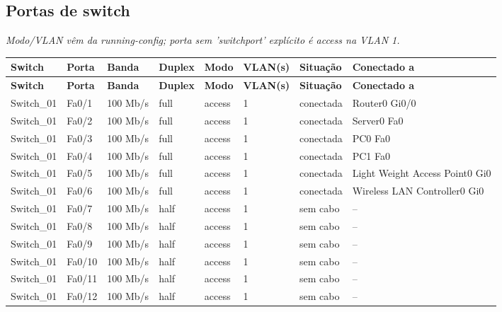 \subsection{Portas de switch}
\noindent\textit{Modo/VLAN vêm da running-config; porta sem 'switchport' explícito é access na VLAN 1.}\par\smallskip
\begingroup\scriptsize\setlength{\tabcolsep}{3pt}
\begin{longtable}{@{}p{}p{}p{}p{}p{}p{}p{}p{}@{}}
\toprule \textbf{Switch} & \textbf{Porta} & \textbf{Banda} & \textbf{Duplex} & \textbf{Modo} & \textbf{VLAN(s)} & \textbf{Situação} & \textbf{Conectado a} \\\midrule\endfirsthead
\toprule \textbf{Switch} & \textbf{Porta} & \textbf{Banda} & \textbf{Duplex} & \textbf{Modo} & \textbf{VLAN(s)} & \textbf{Situação} & \textbf{Conectado a} \\\midrule\endhead
Switch\_01 & Fa0/1 & 100 Mb/s & full & access & 1 & conectada & Router0 Gi0/0 \\
Switch\_01 & Fa0/2 & 100 Mb/s & full & access & 1 & conectada & Server0 Fa0 \\
Switch\_01 & Fa0/3 & 100 Mb/s & full & access & 1 & conectada & PC0 Fa0 \\
Switch\_01 & Fa0/4 & 100 Mb/s & full & access & 1 & conectada & PC1 Fa0 \\
Switch\_01 & Fa0/5 & 100 Mb/s & full & access & 1 & conectada & Light Weight Access Point0 Gi0 \\
Switch\_01 & Fa0/6 & 100 Mb/s & full & access & 1 & conectada & Wireless LAN Controller0 Gi0 \\
Switch\_01 & Fa0/7 & 100 Mb/s & half & access & 1 & sem cabo & -- \\
Switch\_01 & Fa0/8 & 100 Mb/s & half & access & 1 & sem cabo & -- \\
Switch\_01 & Fa0/9 & 100 Mb/s & half & access & 1 & sem cabo & -- \\
Switch\_01 & Fa0/10 & 100 Mb/s & half & access & 1 & sem cabo & -- \\
Switch\_01 & Fa0/11 & 100 Mb/s & half & access & 1 & sem cabo & -- \\
Switch\_01 & Fa0/12 & 100 Mb/s & half & access & 1 & sem cabo & -- \\

\end{longtable}

